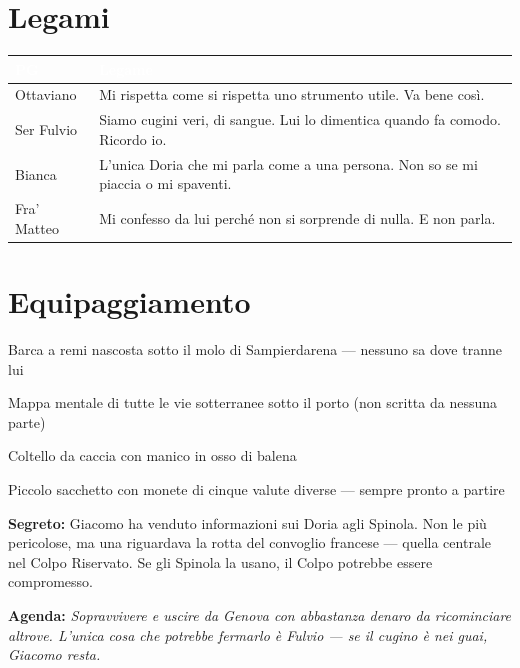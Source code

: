 \section*{Legami}
\begin{table}[h]
\centering\renewcommand{\arraystretch}{1.4}
\begin{tabularx}{\linewidth}{@{}L{2.4cm} X@{}}
  \toprule{}
  \textcolor{white}{\textbf{PG}} & \textcolor{white}{\textbf{Legame}} \\
  \midrule
  Ottaviano & Mi rispetta come si rispetta uno strumento utile. Va bene così. \\
  Ser Fulvio & Siamo cugini veri, di sangue. Lui lo dimentica quando fa comodo. Ricordo io. \\
  Bianca & L'unica Doria che mi parla come a una persona. Non so se mi piaccia o mi spaventi. \\
  Fra' Matteo & Mi confesso da lui perché non si sorprende di nulla. E non parla. \\
  \bottomrule
\end{tabularx}
\end{table}

\section*{Equipaggiamento}
\begin{goldlist}
  \item Barca a remi nascosta sotto il molo di Sampierdarena — nessuno sa dove tranne lui
  \item Mappa mentale di tutte le vie sotterranee sotto il porto (non scritta da nessuna parte)
  \item Coltello da caccia con manico in osso di balena
  \item Piccolo sacchetto con monete di cinque valute diverse — sempre pronto a partire
\end{goldlist}

\clearpage

\begin{secretbox}
  \textbf{Segreto:} Giacomo ha venduto informazioni sui Doria agli Spinola. Non le più
  pericolose, ma una riguardava la rotta del convoglio francese — quella centrale nel
  Colpo Riservato. Se gli Spinola la usano, il Colpo potrebbe essere compromesso.

  \medskip\noindent\textcolor{SecretRed}{\textbf{Agenda:}}
  \textit{Sopravvivere e uscire da Genova con abbastanza denaro da ricominciare altrove.
  L'unica cosa che potrebbe fermarlo è Fulvio — se il cugino è nei guai, Giacomo resta.}
\end{secretbox}
